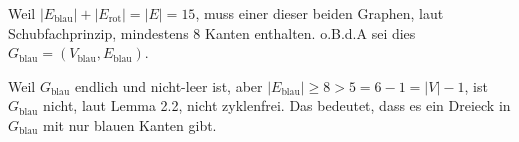 \begin{solution}
Weil $|E_{\text{blau}}| + |E_{\text{rot}}| = |E| = 15$, muss einer dieser beiden Graphen, laut Schubfachprinzip, mindestens $8$ Kanten enthalten.
o.B.d.A sei dies $G_{\text{blau}} = (V_{\text{blau}}, E_{\text{blau}})$.


Weil $G_{\text{blau}}$ endlich und nicht-leer ist, aber $|E_{\text{blau}}| \geq 8 > 5 = 6 - 1 = |V| - 1$, ist $G_{\text{blau}}$ nicht, laut Lemma 2.2, nicht zyklenfrei.
Das bedeutet, dass es ein Dreieck in $G_{\text{blau}}$ mit nur blauen Kanten gibt.

\end{solution}

